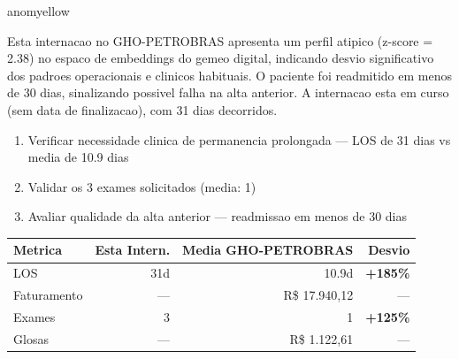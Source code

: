 \documentclass[a4paper,10pt]{article}
\begin{document}
\begin{anomalycard}[Internacao 166323 | GHO-PETROBRAS | MODERADO (z=2.38)]{anomyellow}
\vspace{2pt}\begin{tcolorbox}[colback=severityred!20,colframe=anomyellow,title={\textbf{Interpretacao de Negocio}},fonttitle=\bfseries\small,left=4pt,right=4pt,top=3pt,bottom=3pt]
{\small Esta internacao no GHO-PETROBRAS apresenta um perfil atipico (z-score = 2.38) no espaco de embeddings do gemeo digital, indicando desvio significativo dos padroes operacionais e clinicos habituais. O paciente foi readmitido em menos de 30 dias, sinalizando possivel falha na alta anterior. A internacao esta em curso (sem data de finalizacao), com 31 dias decorridos.}
\end{tcolorbox}
\begin{tcolorbox}[colback=severityyellow!30,colframe=anomorange,title={\textbf{Recomendacoes Especificas}},fonttitle=\bfseries\small,left=4pt,right=4pt,top=3pt,bottom=3pt]
\begin{enumerate}[nosep,leftmargin=16pt]
\item {\small Verificar necessidade clinica de permanencia prolongada --- LOS de 31 dias vs media de 10.9 dias}
\item {\small Validar os 3 exames solicitados (media: 1)}
\item {\small Avaliar qualidade da alta anterior --- readmissao em menos de 30 dias}
\end{enumerate}
\end{tcolorbox}
\begin{center}\begin{tabular}{l r r r}\toprule\textbf{Metrica} & \textbf{Esta Intern.} & \textbf{Media GHO-PETROBRAS} & \textbf{Desvio} \\\midrule
LOS & 31d & 10.9d & \textcolor{anomred}{\textbf{+185\%}} \\
Faturamento & --- & R\$ 17.940,12 & --- \\
Exames & 3 & 1 & \textcolor{anomred}{\textbf{+125\%}} \\
Glosas & --- & R\$ 1.122,61 & --- \\
\bottomrule\end{tabular}\end{center}


\end{anomalycard}
\end{document}

